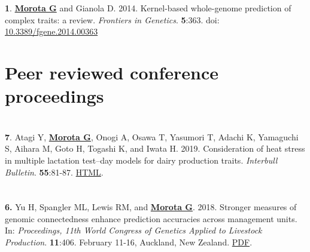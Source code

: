 \documentclass[margin,line,10pt]{res}
\newenvironment{list1}{
  \begin{list}{\ding{113}}{%
      \setlength{\itemsep}{0in}
      \setlength{\parsep}{0in} \setlength{\parskip}{0in}
      \setlength{\topsep}{0in} \setlength{\partopsep}{0in} 
      \setlength{\leftmargin}{0.17in}}}{\end{list}}
\begin{document}
\begin{resume}
\begin{list1}
\end{list1}


\section{}
\begin{list1}

 \item [{\bf 1}.]  {\bf \underline{Morota G}} and Gianola D. 2014. 
  Kernel-based whole-genome prediction of complex traits: a review. \emph{Frontiers in Genetics}. {\bf 5}:363. doi: \textcolor{blue}{\href{http://dx.doi.org/10.3389/fgene.2014.00363}{10.3389/fgene.2014.00363}} 


\end{list1}



\vspace{1.0cm}
\section{\sc Peer reviewed conference proceedings}
\vspace{1.5cm}

\section{}
\begin{list1}

\item [{\bf 7}.] Atagi Y, {\bf \underline{Morota G}}, Onogi A, Osawa T, Yasumori T, Adachi K, Yamaguchi S, Aihara M, Goto H, Togashi K, and Iwata H. 2019. Consideration of heat stress in multiple lactation test–day models for dairy production traits. \emph{Interbull Bulletin}. \textbf{55}:81-87. \textcolor{blue}{\href{https://journal.interbull.org/index.php/ib/article/view/1467}{HTML}}.

\end{list1}


\section{}
\begin{list1}
  
\item [\bf{6}.] Yu H, Spangler ML, Lewis RM, and {\bf \underline{Morota G}}. 2018. 
Stronger measures of genomic connectedness enhance prediction accuracies across management units. In: \emph{Proceedings, 11th World Congress of Genetics Applied to Livestock Production}. \textbf{11}:406. February 11-16, Auckland, New Zealand. 
\textcolor{blue}{\href{http://www.wcgalp.org/proceedings/2018/stronger-measures-genomic-connectedness-enhance-prediction-accuracies-across}{PDF}}.  


\end{list1}
\end{resume}
\end{document}
